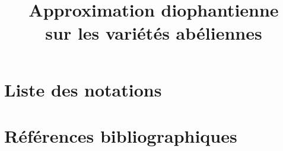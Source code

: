 \documentclass[
] {mpg-preth}
\title{Approximation diophantienne \\ sur les variétés abéliennes}
\begin{document}
\maketitle
{}






\appendix



\chapter{Liste des notations}
\printnomenclature

\chapter{Références bibliographiques}
\printbibliography[heading=bibempty]
\end{document}
